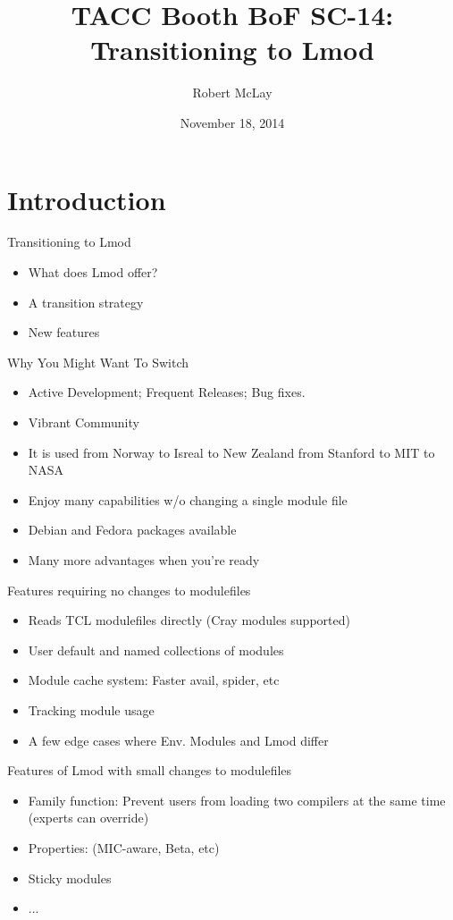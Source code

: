 \documentclass{beamer}
\title{TACC Booth BoF SC-14: Transitioning to Lmod}
\author{Robert McLay}
\institute{The Texas Advanced Computing Center}
\date{November 18, 2014}  %
\begin{document}
\begin{frame}
  \titlepage
\end{frame}

\section{Introduction}

\begin{frame}{Transitioning to Lmod}
  \begin{itemize}
    \item What does Lmod offer?
    \item A transition strategy
    \item New features
  \end{itemize}
\end{frame}


\begin{frame}{Why You Might Want To Switch}
  \begin{itemize}
    \item Active Development;  Frequent Releases; Bug fixes.
    \item Vibrant Community
    \item It is used from Norway to Isreal to New Zealand from Stanford to MIT to NASA
    \item Enjoy many capabilities w/o changing a single module file
    \item Debian and Fedora packages available
    \item Many more advantages when you're ready
  \end{itemize}
\end{frame}

\begin{frame}{Features requiring no changes to modulefiles}
  \begin{itemize}
    \item Reads TCL modulefiles directly (Cray modules supported)
    \item User default and named collections of modules
    \item Module cache system: Faster avail, spider, etc
    \item Tracking module usage 
    \item A few edge cases where Env. Modules and Lmod differ
  \end{itemize}
\end{frame}

\begin{frame}{Features of Lmod with small changes to modulefiles}
  \begin{itemize}
    \item Family function: Prevent users from loading two compilers at
      the same time (experts can override)
    \item Properties: (MIC-aware, Beta, etc)
    \item Sticky modules
    \item ...
  \end{itemize}
\end{frame}
\end{document}
